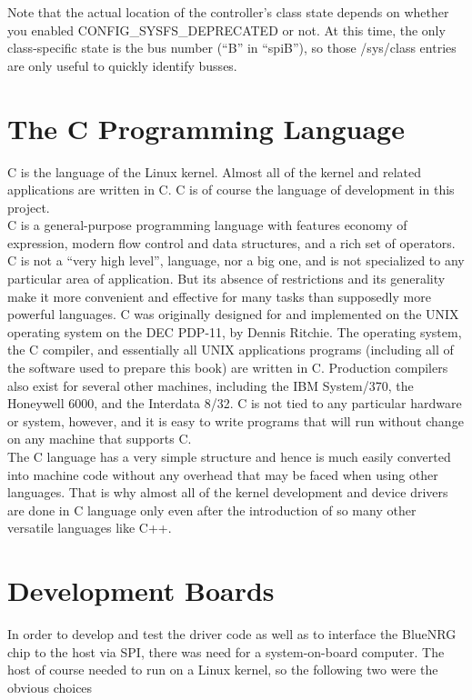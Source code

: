 Note that the actual location of the controller's class state depends on whether you enabled CONFIG\_SYSFS\_DEPRECATED or not.  At this time, the only class-specific state is the bus number (``B'' in ``spiB''), so those /sys/class entries are only useful to quickly identify busses.
\section{The C Programming Language}
C is the language of the Linux kernel. Almost all of the kernel and related applications are written in C. C is of course the language of development in this project.\\
C is a general-purpose programming language with features economy of expression, modern flow control and data structures, and a rich set of operators. C is not a ``very high level'', language, nor a big one, and is not specialized to any particular area of application. But its absence of restrictions and its generality make it more convenient and effective for many tasks than supposedly more powerful languages. C was originally designed for and implemented on the UNIX operating system on the DEC PDP-11, by Dennis Ritchie. The operating system, the C compiler, and essentially all UNIX applications programs (including all of the software used to prepare this book) are written in C. Production compilers also exist for several other machines, including the IBM System/370, the Honeywell 6000, and the Interdata 8/32. C is not tied to any particular hardware or system, however, and it is easy to write programs that will run without change on any machine that supports C.\\
The C language has a very simple structure and hence is much easily converted into machine code without any overhead that may be faced when using other languages. That is why almost all of the kernel development and device drivers are done in C language only even after the introduction of so many other versatile languages like C++.
\section{Development Boards}
In order to develop and test the driver code as well as to interface the BlueNRG chip to the host via SPI, there was need for a system-on-board computer. The host of course needed to run on a Linux kernel, so the following two were the obvious choices
